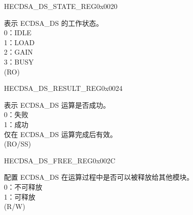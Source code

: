 \begin{register}{H}{ECDSA\_DS\_STATE\_REG}{0x0020}\label{regdesc:ECDSADSSTATEREG}
%
%
\regnewline%
\begin{regdesc}\begin{reglist}
\label{fielddesc:ECDSADSBUSY}\item [ECDSA\_DS\_BUSY] 表示 ECDSA\_DS 的工作状态。\\
0：IDLE\\
1：LOAD\\
2：GAIN\\
3：BUSY\\
(RO)
\end{reglist}\end{regdesc}
\end{register}


\begin{register}{H}{ECDSA\_DS\_RESULT\_REG}{0x0024}\label{regdesc:ECDSADSRESULTREG}
%
%
\regnewline%
\begin{regdesc}\begin{reglist}
\label{fielddesc:ECDSADSOPERATIONRESULT}\item [ECDSA\_DS\_OPERATION\_RESULT] 表示 ECDSA\_DS 运算是否成功。\\
0：失败\\
1：成功\\
仅在 ECDSA\_DS 运算完成后有效。\\
(RO/SS)
\end{reglist}\end{regdesc}
\end{register}


\begin{register}{H}{ECDSA\_DS\_FREE\_REG}{0x002C}\label{regdesc:ECDSADSFREEREG}
%
%
\regnewline%
\begin{regdesc}\begin{reglist}
\label{fielddesc:ECDSADSFREE}\item [ECDSA\_DS\_FREE] 配置 ECDSA\_DS 在运算过程中是否可以被释放给其他模块。\\
0：不可释放\\
1：可释放\\
(R/W)
\end{reglist}\end{regdesc}
\end{register}


